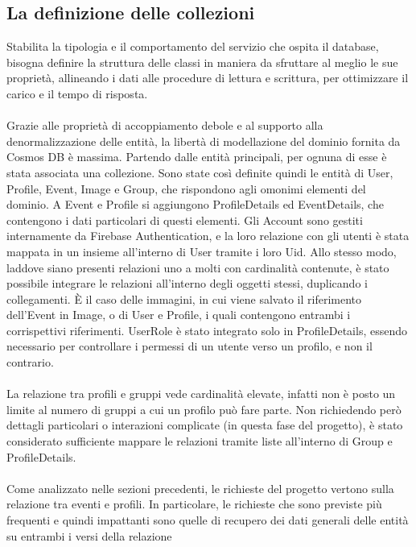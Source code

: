 \subsection{La definizione delle collezioni}

Stabilita la tipologia e il comportamento del servizio che ospita il database, 
bisogna definire la struttura delle classi in maniera da sfruttare al meglio le sue proprietà,
allineando i dati alle procedure di lettura e scrittura,
per ottimizzare il carico e il tempo di risposta.\\
\\
Grazie alle proprietà di accoppiamento debole e al supporto alla denormalizzazione delle entità,
la libertà di modellazione del dominio fornita da Cosmos DB è massima. 
Partendo dalle entità principali, per ognuna di esse è stata associata una collezione.
Sono state così definite quindi le entità di User, Profile, Event, Image e Group, 
che rispondono agli omonimi elementi del dominio.
A Event e Profile si aggiungono ProfileDetails ed EventDetails,
che contengono i dati particolari di questi elementi.
Gli Account sono gestiti internamente da Firebase Authentication, 
e la loro relazione con gli utenti è stata mappata in un insieme all'interno di User 
tramite i loro Uid.
Allo stesso modo, laddove siano presenti relazioni uno a molti con cardinalità contenute,
è stato possibile integrare le relazioni all'interno degli oggetti stessi, duplicando i collegamenti.
È il caso delle immagini, in cui viene salvato il riferimento dell'Event in Image,
o di User e Profile, i quali contengono entrambi i corrispettivi riferimenti.
UserRole è stato integrato solo in ProfileDetails, 
essendo necessario per controllare i permessi di un utente verso un profilo, e non il contrario.\\
\\
La relazione tra profili e gruppi vede cardinalità elevate, 
infatti non è posto un limite al numero di gruppi a cui un profilo può fare parte.
Non richiedendo però dettagli particolari o interazioni complicate (in questa fase del progetto),
è stato considerato sufficiente mappare le relazioni tramite liste all'interno di Group e ProfileDetails.\\
\\
Come analizzato nelle sezioni precedenti, 
le richieste del progetto vertono sulla relazione tra eventi e profili.
In particolare, le richieste che sono previste più frequenti e quindi impattanti 
sono quelle di recupero dei dati generali delle entità su entrambi i versi della relazione
